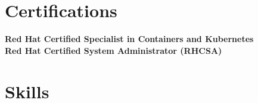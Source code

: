 \documentclass[]{resume-openfont}
\newcommand{\certificationHeading}[3]{\textbf{#1}\hspace*{\fill}{#2}\\}
\begin{document}
\section{Certifications}
\certificationHeading{Red Hat Certified Specialist in Containers and Kubernetes}{Podman, Kubernetes, OpenShift}\\
\certificationHeading{Red Hat Certified System Administrator (RHCSA)}{Bash, Linux, RHEL8}\\
\sectionsep

\section{Skills}
\begin{skillList}

\end{skillList}

\end{document}
